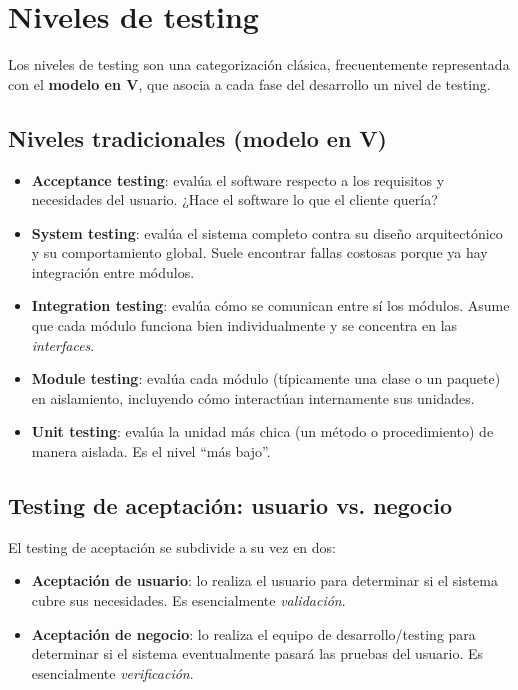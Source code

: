 \documentclass[12pt,a4paper]{article}
\begin{document}
\section{Niveles de testing}
Los niveles de testing son una categorización clásica, frecuentemente representada con el \textbf{modelo en V}, que asocia a cada fase del desarrollo un nivel de testing.

\subsection{Niveles tradicionales (modelo en V)}
\begin{itemize}
  \item \textbf{Acceptance testing}: evalúa el software respecto a los requisitos y necesidades del usuario. ¿Hace el software lo que el cliente quería?
  \item \textbf{System testing}: evalúa el sistema completo contra su diseño arquitectónico y su comportamiento global. Suele encontrar fallas costosas porque ya hay integración entre módulos.
  \item \textbf{Integration testing}: evalúa cómo se comunican entre sí los módulos. Asume que cada módulo funciona bien individualmente y se concentra en las \textit{interfaces}.
  \item \textbf{Module testing}: evalúa cada módulo (típicamente una clase o un paquete) en aislamiento, incluyendo cómo interactúan internamente sus unidades.
  \item \textbf{Unit testing}: evalúa la unidad más chica (un método o procedimiento) de manera aislada. Es el nivel ``más bajo''.
\end{itemize}

\subsection{Testing de aceptación: usuario vs. negocio}
El testing de aceptación se subdivide a su vez en dos:
\begin{itemize}
  \item \textbf{Aceptación de usuario}: lo realiza el usuario para determinar si el sistema cubre sus necesidades. Es esencialmente \textit{validación}.
  \item \textbf{Aceptación de negocio}: lo realiza el equipo de desarrollo/testing para determinar si el sistema eventualmente pasará las pruebas del usuario. Es esencialmente \textit{verificación}.
\end{itemize}
\end{document}
